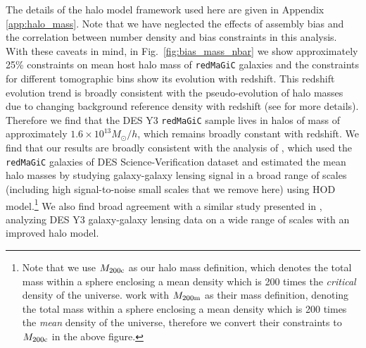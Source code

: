 \documentclass[aps, prd,twocolumn,superscriptaddress,nofootinbib,preprintnumbers]{revtex4-1}
\newcommand{\redmagic}{\texttt{redMaGiC} }
\newcommand{\blue}[1]{\textcolor{blue}{#1}}
\begin{document}
The details of the halo model framework used here are given in Appendix \ref{app:halo_mass}. Note that we have neglected the effects of assembly bias and the correlation between number density and bias constraints in this analysis. With these caveats in mind, in Fig.~\ref{fig:bias_mass_nbar} we show approximately 25\% constraints on mean host halo mass of \redmagic galaxies and the constraints for different tomographic bins show its evolution with redshift. This redshift evolution trend is broadly consistent with the pseudo-evolution of halo masses due to changing background reference density with redshift (see \citep{Diemer_2013} for more details). Therefore we find that the DES Y3 \redmagic sample lives in halos of mass of approximately $1.6 \times 10^{13} M_{\odot}/h$, which remains broadly constant with redshift. We find that our results are broadly consistent with the analysis of \citep{Clampitt_2016}, which used the \redmagic galaxies of DES Science-Verification dataset and estimated the mean halo masses by studying galaxy-galaxy lensing signal in a broad range of scales (including high signal-to-noise small scales that we remove here) using HOD model.\footnote{Note that we use $M_{\rm 200c}$ as our halo mass definition, which denotes the total mass within a sphere enclosing a mean density which is 200 times the \textit{critical} density of the universe. \citet{Clampitt_2016} work with $M_{\rm 200m}$ as their mass definition, denoting the total mass within a sphere enclosing a mean density which is 200 times the \textit{mean} density of the universe, therefore we convert their constraints to $M_{\rm 200c}$ in the above figure.} We also find broad agreement with a similar study presented in \citet{zacharegkas_hod}, analyzing DES Y3 galaxy-galaxy lensing data on a wide range of scales with an improved halo model. 




\end{document}
